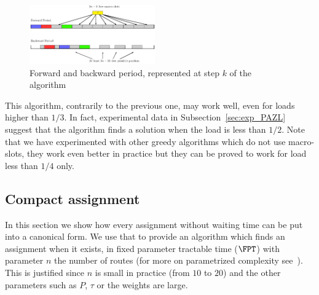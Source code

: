 \documentclass[10pt, conference, letterpaper]{IEEEtran}
\begin{document}
     \begin{figure}
      \begin{center}
      \includegraphics[width=0.48\textwidth]{ex3nt.pdf}
      \end{center}
      \caption{Forward and backward period, represented at step $k$ of the algorithm}
      \end{figure}
% 
% 
% 
	
This algorithm, contrarily to the previous one, may work well, even for loads higher than $1/3$.
In fact, experimental data in Subsection~\ref{sec:exp_PAZL} suggest that the algorithm finds a solution when the load is less than $1/2$. Note that we have experimented with other greedy algorithms which do not use macro-slots, they work even better in practice but they can be proved to work for load less than $1/4$ only.

\subsection{Compact assignment}

In this section we show how every assignment without waiting time can be put into a canonical form.
We use that to provide an algorithm which finds an assignment when it exists, in fixed parameter tractable time ($\FPT$) with parameter $n$ the number of routes (for more on parametrized complexity see~\cite{downey2012parameterized}). This is justified since $n$ is small in practice (from $10$ to $20$) and the other parameters such as $P$, $\tau$ or the weights are large.
\end{document}

